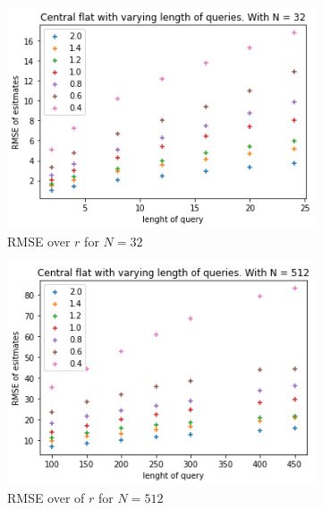 \documentclass[11pt]{article}
\theoremstyle{definition}
\begin{document}
\begin{figure}[H]
\centering
\begin{subfigure}{.4\textwidth}
  \centering
  \includegraphics[width=\linewidth]{figures/central_flat/varying_r/cen_flat_varying_length_N=32.png}
  \caption{RMSE over $r$ for $N=32$}
  \label{fig:cen_r_sub1}
\end{subfigure}%
\begin{subfigure}{.4\textwidth}
  \centering
  \includegraphics[width=\linewidth]{figures/central_flat/varying_r/cen_flat_varying_length_N=512.png}
  \caption{RMSE over of $r$ for $N=512$}
  \label{fig:cen_r_sub2}
\end{subfigure}
\begin{subfigure}{.4\textwidth}
  \centering

\end{subfigure}
\end{figure}
\end{document}
